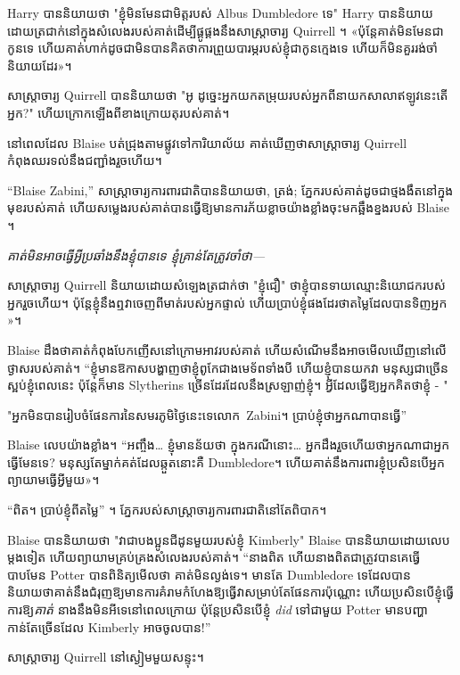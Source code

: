 Harry បាននិយាយថា "ខ្ញុំមិនមែនជាមិត្តរបស់ Albus Dumbledore ទេ" Harry បាននិយាយដោយត្រជាក់នៅក្នុងសំលេងរបស់គាត់ដើម្បីផ្គូផ្គងនឹងសាស្រ្តាចារ្យ Quirrell ។ «​ប៉ុន្តែ​គាត់​មិន​មែន​ជា​កូន​ទេ ហើយ​គាត់​ហាក់​ដូច​ជា​មិន​បាន​គិត​ថា​ការ​ព្រួយ​បារម្ភ​របស់​ខ្ញុំ​ជា​កូន​ក្មេង​ទេ ហើយ​ក៏​មិន​គួរ​រង់​ចាំ​និយាយ​ដែរ»។

សាស្រ្តាចារ្យ Quirrell បាននិយាយថា "អូ ដូច្នេះអ្នកយកតម្រុយរបស់អ្នកពីនាយកសាលាឥឡូវនេះតើអ្នក?" ហើយក្រោកឡើងពីខាងក្រោយតុរបស់គាត់។

\later

នៅពេលដែល Blaise បត់ជ្រុងតាមផ្លូវទៅការិយាល័យ គាត់ឃើញថាសាស្រ្តាចារ្យ Quirrell កំពុងឈរទល់នឹងជញ្ជាំងរួចហើយ។

“Blaise Zabini,” សាស្ត្រាចារ្យការពារជាតិបាននិយាយថា, ត្រង់; ភ្នែករបស់គាត់ដូចជាថ្មងងឹតនៅក្នុងមុខរបស់គាត់ ហើយសម្លេងរបស់គាត់បានធ្វើឱ្យមានការភ័យខ្លាចយ៉ាងខ្លាំងចុះមកឆ្អឹងខ្នងរបស់ Blaise ។

\emph{គាត់មិនអាចធ្វើអ្វីប្រឆាំងនឹងខ្ញុំបានទេ ខ្ញុំគ្រាន់តែត្រូវចាំថា—}

សាស្ត្រាចារ្យ Quirrell និយាយដោយសំឡេងត្រជាក់ថា "ខ្ញុំជឿ" ថាខ្ញុំបានទាយឈ្មោះនិយោជករបស់អ្នករួចហើយ។ ប៉ុន្តែ​ខ្ញុំ​នឹង​ឮ​វា​ចេញ​ពី​មាត់​របស់​អ្នក​ផ្ទាល់ ហើយ​ប្រាប់​ខ្ញុំ​ផង​ដែរ​ថា​តម្លៃ​ដែល​បាន​ទិញ​អ្នក​»។

Blaise ដឹងថាគាត់កំពុងបែកញើសនៅក្រោមអាវរបស់គាត់ ហើយសំណើមនឹងអាចមើលឃើញនៅលើថ្ងាសរបស់គាត់។ “ខ្ញុំមានឱកាសបង្ហាញថាខ្ញុំពូកែជាងមេទ័ពទាំងបី ហើយខ្ញុំបានយកវា មនុស្ស​ជា​ច្រើន​ស្អប់​ខ្ញុំ​ពេល​នេះ ប៉ុន្តែ​ក៏​មាន Slytherins ច្រើន​ដែរ​ដែល​នឹង​ស្រឡាញ់​ខ្ញុំ។ អ្វីដែលធ្វើឱ្យអ្នកគិតថាខ្ញុំ - "

"អ្នកមិនបានរៀបចំផែនការនៃសមរភូមិថ្ងៃនេះទេលោក~Zabini។ ប្រាប់ខ្ញុំថាអ្នកណាបានធ្វើ”

Blaise លេប​យ៉ាង​ខ្លាំង។ “អញ្ចឹង… ខ្ញុំមានន័យថា ក្នុងករណីនោះ… អ្នកដឹងរួចហើយថាអ្នកណាជាអ្នកធ្វើមែនទេ? មនុស្សតែម្នាក់គត់ដែលឆ្កួតនោះគឺ Dumbledore។ ហើយ​គាត់​នឹង​ការពារ​ខ្ញុំ​ប្រសិន​បើ​អ្នក​ព្យាយាម​ធ្វើ​អ្វី​មួយ»។

“ពិត។ ប្រាប់ខ្ញុំពីតម្លៃ” ។ ភ្នែករបស់សាស្ត្រាចារ្យការពារជាតិនៅតែពិបាក។

Blaise បាននិយាយថា "វាជាបងប្អូនជីដូនមួយរបស់ខ្ញុំ Kimberly" Blaise បាននិយាយដោយលេបម្តងទៀត ហើយព្យាយាមគ្រប់គ្រងសំលេងរបស់គាត់។ “នាងពិត ហើយនាងពិតជាត្រូវបានគេធ្វើបាបមែន Potter បានពិនិត្យមើលថា គាត់មិនល្ងង់ទេ។ មានតែ Dumbledore ទេដែលបាននិយាយថាគាត់នឹងជំរុញឱ្យមានការគំរាមកំហែងឱ្យធ្វើវាសម្រាប់តែផែនការប៉ុណ្ណោះ ហើយប្រសិនបើខ្ញុំធ្វើការឱ្យ\emph{គាត់} នាងនឹងមិនអីទេនៅពេលក្រោយ ប៉ុន្តែប្រសិនបើខ្ញុំ \emph{did} ទៅជាមួយ Potter មានបញ្ហាកាន់តែច្រើនដែល Kimberly អាចចូលបាន!”

សាស្ត្រាចារ្យ Quirrell នៅស្ងៀមមួយសន្ទុះ។

